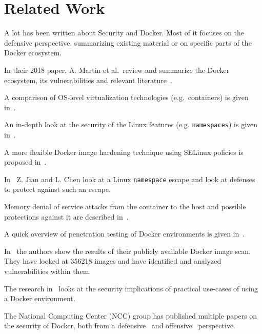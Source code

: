 \chapter{Related Work}\label{chapter:relatedwork}
A lot has been written about Security and Docker. Most of it focuses on the defensive perspective, summarizing existing material or on specific parts of the Docker ecosystem.

\medskip

In their 2018 paper, A. Martin et al.\ review and summarize the Docker ecosystem, its vulnerabilities and relevant literature~\cite{Docker-Ecosystem-Vulnerability-Analysis}.

A comparison of OS-level virtualization technologies (e.g.\ containers) is given in~\cite{Security-OS-level-Virtualization}.

An in-depth look at the security of the Linux features (e.g. \lstinline{namespaces}) is given in~\cite{Analysis-Docker-Security}.

A more flexible Docker image hardening technique using SELinux policies is proposed in~\cite{DockerPolicyModules}.

In~\cite{Defense-Docker-Escape} Z. Jian and L. Chen look at a Linux \lstinline{namespace} escape and look at defenses to protect against such an escape.

Memory denial of service attacks from the container to the host and possible protections against it are described in~\cite{Securing-Docker-Containers-from-DOS}.

A quick overview of penetration testing of Docker environments is given in~\cite{Research-Pentesting-Docker-Environment}.

In~\cite{Study-Vulnerabilities-Docker-Hub} the authors show the results of their publicly available Docker image scan. They have looked at 356218 images and have identified and analyzed vulnerabilities within them.

The research in~\cite{To-Docker-Not-To-Docker} looks at the security implications of practical use-cases of using a Docker environment.

The National Computing Center (NCC) group has published multiple papers on the security of Docker, both from a defensive~\cite{Understanding-and-Hardening-Linux-Containers} and offensive~\cite{Abusing-Containers} perspective.
